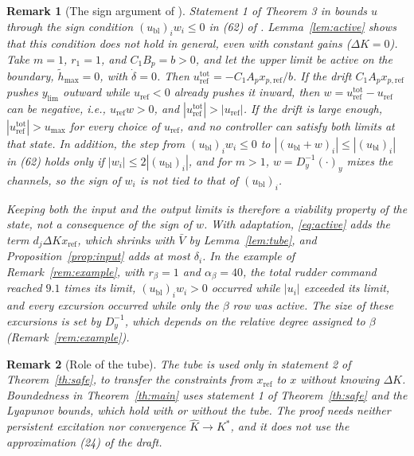 \documentclass[lettersize,journal]{IEEEtran}
\newtheorem{remark}{Remark}
\newcommand{\Kh}{\hat{K}}
\newcommand{\xr}{x_{\mathrm{ref}}}
\newcommand{\xpr}{x_{p,\mathrm{ref}}}
\newcommand{\ub}{u_{\mathrm{bl}}}
\newcommand{\uref}{u_{\mathrm{ref}}}
\newcommand{\utot}{u_{\mathrm{ref}}^{\mathrm{tot}}}
\newcommand{\ylim}{y_{\mathrm{lim}}}
\newcommand{\Vb}{\bar{V}}
\begin{document}
\begin{remark}[The sign argument of \cite{lavretsky2025}] \label{rem:total}
Statement 1 of Theorem 3 in \cite{lavretsky2025} bounds $u$ through the sign condition $(\ub)_iw_i\le0$ in (62) of \cite{lavretsky2025}. Lemma~\ref{lem:active} shows that this condition does not hold in general, even with constant gains ($\Delta K=0$). Take $m=1$, $r_1=1$, and $C_1B_p=b>0$, and let the upper limit be active on the boundary, $\tilde h_{\max}=0$, with $\dot\delta=0$. Then $\utot=-C_1A_p\xpr/b$. If the drift $C_1A_p\xpr$ pushes $\ylim$ outward while $\uref<0$ already pushes it inward, then $w=\utot-\uref$ can be negative, i.e., $\uref w>0$, and $|\utot|>|\uref|$. If the drift is large enough, $|\utot|>u_{\max}$ for every choice of $\uref$, and no controller can satisfy both limits at that state. In addition, the step from $(\ub)_iw_i\le0$ to $|(\ub+w)_i|\le|(\ub)_i|$ in (62) holds only if $|w_i|\le2|(\ub)_i|$, and for $m>1$, $w=D_y^{-1}(\cdot)_y$ mixes the channels, so the sign of $w_i$ is not tied to that of $(\ub)_i$.

Keeping both the input and the output limits is therefore a viability property of the state, not a consequence of the sign of $w$. With adaptation, \eqref{eq:active} adds the term $d_j\Delta K\xr$, which shrinks with $\Vb$ by Lemma~\ref{lem:tube}, and Proposition~\ref{prop:input} adds at most $\delta_i$. In the example of Remark~\ref{rem:example}, with $r_\beta=1$ and $\alpha_\beta=40$, the total rudder command reached $9.1$ times its limit, $(\ub)_iw_i>0$ occurred while $|u_i|$ exceeded its limit, and every excursion occurred while only the $\beta$ row was active. The size of these excursions is set by $D_y^{-1}$, which depends on the relative degree assigned to $\beta$ (Remark~\ref{rem:example}).
\end{remark}

\begin{remark}[Role of the tube]
The tube is used only in statement 2 of Theorem~\ref{th:safe}, to transfer the constraints from $\xr$ to $x$ without knowing $\Delta K$. Boundedness in Theorem~\ref{th:main} uses statement 1 of Theorem~\ref{th:safe} and the Lyapunov bounds, which hold with or without the tube. The proof needs neither persistent excitation nor convergence $\Kh\to K^*$, and it does not use the approximation (24) of the draft.
\end{remark}
\end{document}
